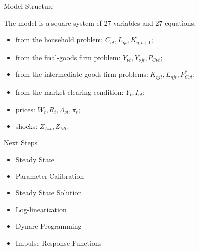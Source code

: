 \documentclass[../quali_slides.tex]{subfiles}
\begin{document}
\begin{frame}{Model Structure}
	
	The model is a square system of 27 variables and 27 equations.
	
	\begin{itemize}
		
		\item from the household problem: $C_{\eta t}, L_{\eta t}, K_{\eta, t+1}$;
		
		\item from the final-goods firm problem: $Y_{\nu t}, Y_{\nu jt}, P_{C\nu t}$;
		
		\item from the intermediate-goods firm problems: $K_{\eta jt}, L_{\eta jt}, P_{C\nu t}^\ast$;
		
		\item from the market clearing condition: $Y_t, I_{\eta t}$;
		
		\item prices: $W_t, R_t, \Lambda_{\nu t}, \pi_t$;
		
		\item shocks: $Z_{A\nu t}, Z_{Mt}$.
		
	\end{itemize}
	
\end{frame}


\begin{frame}{Next Steps}
	
	\begin{itemize}
		
		\item Steady State
		
		\item Parameter Calibration
		
		\item Steady State Solution
		
		\item Log-linearization
		
		\item Dynare Programming
		
		\item Impulse Response Functions
		
	\end{itemize}
	
\end{frame}
\end{document}
